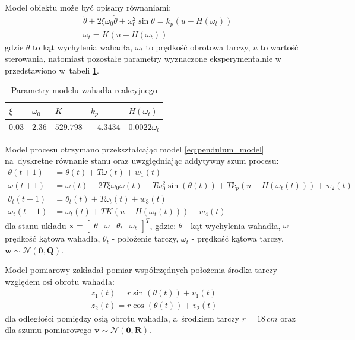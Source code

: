 Model obiektu może być opisany równaniami:
\begin{align}
\label{eq:pendulum_model}
&\ddot{\theta} + 2\xi\omega_0\dot{\theta} + \omega_0^2 \sin \theta = k_p(u - H(\omega_t)) \nonumber \\
&\dot{\omega_t} = K(u - H(\omega_t)) 
\end{align}
gdzie $\theta$ to kąt wychylenia wahadła, $\omega_t$ to prędkość obrotowa tarczy, $u$ to wartość sterowania, natomiast pozostałe parametry wyznaczone eksperymentalnie w~\cite{Pendulum_report} przedstawiono w~tabeli \ref{tab:pendulum_params}.
\begin{table}[]
	\caption{Parametry modelu wahadła reakcyjnego}
	\label{tab:pendulum_params}
	\begin{center}
		\begin{tabular}{|l|l|l|l|l|}
			\hline
			\textbf{$\xi$} & \textbf{$\omega_0$} & \textbf{$K$} & \textbf{$k_p$} & \textbf{$H(\omega_t)$}\\ 
			\hline
			$0.03$ & $2.36$ & $529.798$ & $-4.3434$ & $0.0022\omega_t$ \\
			\hline
		\end{tabular}
	\end{center}
\end{table}
Model procesu otrzymano przekształcając model \ref{eq:pendulum_model} na~dyskretne równanie stanu oraz uwzględniając addytywny szum procesu:
\begin{align}
\label{eq:pendulum_process_model}
\theta(t+1) &= \theta(t) + T\omega(t) + w_1(t) \nonumber \\
\omega(t+1) &= \omega(t) - 2T\xi\omega_0\omega(t) - T\omega_0^2\sin (\theta(t)) + Tk_p(u - H(\omega_t(t))) + w_2(t) \nonumber \\
\theta_t(t+1) &= \theta_t(t) + T\omega_t(t) + w_3(t) \nonumber \\
\omega_t(t+1) &= \omega_t(t) + TK(u - H(\omega_t(t))) + w_4(t) 
\end{align}
dla stanu układu $\boldsymbol{x} = \begin{bmatrix}
\theta & \omega & \theta_t & \omega_t
\end{bmatrix}^T$, gdzie: $\theta$ - kąt wychylenia wahadła, $\omega$ - prędkość kątowa wahadła, $\theta_t$ - położenie tarczy, $\omega_t$ - prędkość kątowa tarczy, $\boldsymbol{w} \sim \mathcal{N}(\boldsymbol{0}, \boldsymbol{Q})$. 
\par
Model pomiarowy zakładał pomiar współrzędnych położenia środka tarczy względem osi obrotu wahadła:
\begin{align}
\label{eq:pendulum_measurement_model}
z_1(t) = r \sin (\theta(t)) + v_1(t) \nonumber \\
z_2(t) = r \cos (\theta(t)) + v_2(t)
\end{align}
dla odległości pomiędzy osią obrotu wahadła, a~środkiem tarczy $r=18\,cm$ oraz dla szumu pomiarowego $\boldsymbol{v} \sim \mathcal{N}(\boldsymbol{0}, \boldsymbol{R})$.
